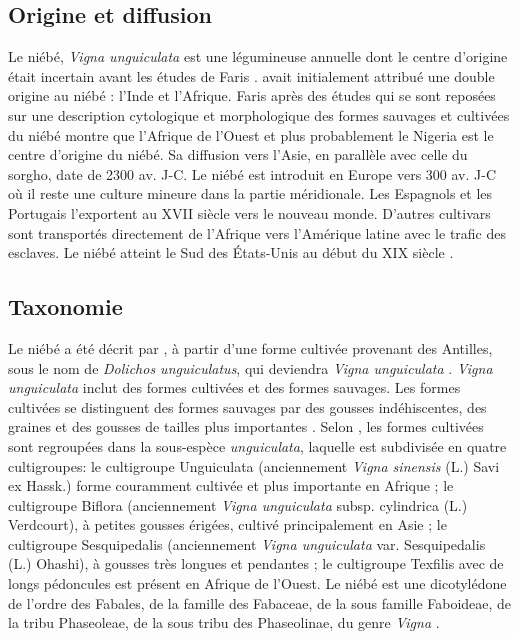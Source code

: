 \documentclass[a4paper,11pt]{article}
\begin{document}
\subsection{Origine et diffusion}

Le niébé, \emph{Vigna unguiculata} est une légumineuse annuelle dont
le centre d'origine était incertain avant les études de Faris
\cite{FARIS_1963,FARIS_1965}.  avait initialement
attribué une double origine au niébé : l'Inde et l'Afrique. Faris
\citeyear{FARIS_1963,FARIS_1965} après des études qui se sont reposées
sur une description cytologique et morphologique des formes sauvages
et cultivées du niébé montre que l'Afrique de l'Ouest et plus
probablement le Nigeria est le centre d'origine du niébé. Sa diffusion
vers l'Asie, en parallèle avec celle du sorgho, date de 2300
av. J-C. Le niébé est introduit en Europe vers 300 av. J-C où il reste
une culture mineure dans la partie méridionale. Les Espagnols et les
Portugais l'exportent au \textsc{XVII}\ieme{} siècle vers le nouveau
monde. D'autres cultivars sont transportés directement de l'Afrique
vers l'Amérique latine avec le trafic des esclaves. Le niébé atteint
le Sud des États-Unis au début du \textsc{XIX}\ieme{} siècle
\cite{Sawadogo_2009}.

\subsection{Taxonomie}

Le niébé a été décrit par , à partir
d'une forme cultivée provenant des Antilles, sous le nom de
\emph{Dolichos unguiculatus}, qui deviendra \emph{Vigna unguiculata}
\cite{Pasquet_1997}. \emph{Vigna unguiculata} inclut des formes
cultivées et des formes sauvages. Les formes cultivées se distinguent
des formes sauvages par des gousses indéhiscentes, des graines et des
gousses de tailles plus importantes \cite{Lush_1981}. Selon
, les formes cultivées sont regroupées dans
la sous-espèce \emph{unguiculata}, laquelle est subdivisée en quatre
cultigroupes: le cultigroupe Unguiculata (anciennement \emph{Vigna
  sinensis} (L.) Savi ex Hassk.)  forme couramment cultivée et plus
importante en Afrique ; le cultigroupe Biflora (anciennement
\emph{Vigna unguiculata} subsp. cylindrica (L.) Verdcourt), à petites
gousses érigées, cultivé principalement en Asie ; le cultigroupe
Sesquipedalis (anciennement \emph{Vigna unguiculata}
var. Sesquipedalis (L.) Ohashi), à gousses très longues et pendantes ;
le cultigroupe Texfilis avec de longs pédoncules est présent en
Afrique de l'Ouest. Le niébé est une dicotylédone de l'ordre des
Fabales, de la famille des Fabaceae, de la sous famille Faboideae, de
la tribu Phaseoleae, de la sous tribu des Phaseolinae, du genre
\emph{Vigna} \cite{Verdcourt_1970, Marechal_1978}.
\end{document}
